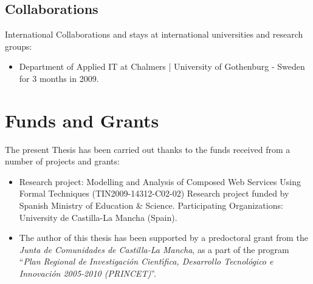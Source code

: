 
\subsection{Collaborations}

International Collaborations and stays at international universities and research groups:

\begin{itemize}

\item Department of Applied IT at Chalmers | University of Gothenburg - Sweden for 3 months in 2009.

\end{itemize}

\section{Funds and Grants}\label{funds}

The present Thesis has been carried out thanks to the funds received from a number of projects and grants:

\begin{itemize}

\item Research project: Modelling and Analysis of Composed Web Services Using Formal Techniques (TIN2009-14312-C02-02)\newline
Research project funded by Spanish Ministry of Education \& Science.\newline
Participating Organizations: University de Castilla-La Mancha (Spain).

\item The author of this thesis has been supported by a predoctoral grant from the \textit{Junta de Comunidades de Castilla-La Mancha}, as a part of the program ``\textit{Plan Regional de Investigaci\'{o}n Cient\'{\i}fica, Desarrollo Tecnol\'{o}gico e Innovaci\'{o}n 2005-2010 (PRINCET)}''.

\end{itemize}